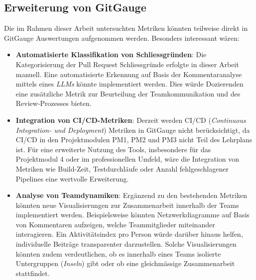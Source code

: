 \subsection{Erweiterung von GitGauge}
Die im Rahmen dieser Arbeit untersuchten Metriken könnten teilweise direkt in GitGauge Auswertungen aufgenommen werden. Besonders interessant wären:
\begin{itemize}
\item \textbf{Automatisierte Klassifikation von Schliessgründen}: Die Kategorisierung der Pull Request Schliessgründe erfolgte in dieser Arbeit manuell. Eine automatisierte Erkennung auf Basis der Kommentaranalyse mittels eines \textit{LLMs} könnte implementiert werden. Dies würde Dozierenden eine zusätzliche Metrik zur Beurteilung der Teamkommunikation und des Review-Prozesses bieten.
\item \textbf{Integration von CI/CD-Metriken}: Derzeit werden CI/CD (\textit{Continuous Integration- und Deployment}) Metriken in GitGauge nicht berücksichtigt, da CI/CD in den Projektmodulen PM1, PM2 und PM3 nicht Teil des Lehrplans ist. Für eine erweiterte Nutzung des Tools, insbesondere für das Projektmodul 4 oder im professionellen Umfeld, wäre die Integration von Metriken wie Build-Zeit, Testdurchläufe oder Anzahl fehlgeschlagener Pipelines eine wertvolle Erweiterung.
\item \textbf{Analyse von Teamdynamiken}: Ergänzend zu den bestehenden Metriken könnten neue Visualisierungen zur Zusammenarbeit innerhalb der Teams implementiert werden. Beispielsweise könnten Netzwerkdiagramme auf Basis von Kommentaren aufzeigen, welche Teammitglieder miteinander interagieren. Ein Aktivitätsindex pro Person würde darüber hinaus helfen, individuelle Beiträge transparenter darzustellen. Solche Visualisierungen könnten zudem verdeutlichen, ob es innerhalb eines Teams isolierte Untergruppen (\textit{Inseln}) gibt oder ob eine gleichmässige Zusammenarbeit stattfindet.
\end{itemize}


